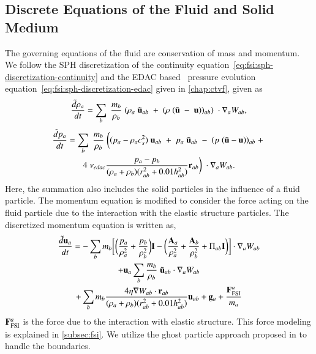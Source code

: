 \subsection{Discrete Equations of the Fluid and Solid Medium}\label{subsec:discrete-fluid}
The governing equations of the fluid are conservation of mass and momentum. We
follow the SPH discretization of the continuity
equation~\eqref{eq:fsi:sph-discretization-continuity} and the EDAC
based~\parencite{PRKP:edac-sph-iccm2015} pressure evolution
equation~\eqref{eq:fsi:sph-discretization-edac} given in \cref{chap:ctvf}, given
as
\begin{equation}
  \label{eq:fsi:sph-discretization-continuity}
  \frac{\tilde{d}\rho_a}{dt} = \sum_{b} \; \frac{m_b}{\rho_{b}} \; (
  \rho_{a} \; \tilde{\mathbf{u}}_{ab} \; + \;
  (\rho \; (\tilde{\mathbf{u}} \; - \;
  \mathbf{u}))_{ab}) \; \cdot \nabla_{a} W_{ab},
\end{equation}
\begin{multline}
  \label{eq:fsi:sph-discretization-edac}
  \frac{\tilde{d}p_a}{dt} = \sum_{b} \; \frac{m_b}{\rho_{b}} \; \bigg(
  (p_{a} - \rho_{a} c_{s}^2) \; \mathbf{u}_{ab} \; + \;
  p_{a} \; \tilde{\mathbf{u}}_{ab} \; - \;
  (p \; (\tilde{\mathbf{u}} - \mathbf{u}))_{ab} \; + \;\\
  4 \; \nu_{edac}
  \frac{p_a - p_b}{(\rho_a + \rho_b) (r^2_{ab} + 0.01 h_{ab}^{2})} \mathbf{r}_{ab}
  \bigg) \; \cdot \nabla_{a} W_{ab}.
\end{multline}
%
Here, the summation also includes the solid particles in the influence of a
fluid particle. The momentum equation is modified to consider the force
acting on the fluid particle due to the interaction with the elastic structure
particles. The discretized momentum equation is written as,
\begin{multline}
  \label{eq:fsi:sph-momentum-fluid}
  \frac{\tilde{d}\mathbf{u}_{a}}{dt} = - \sum_{b} m_b \bigg[
  \bigg(\frac{p_a}{\rho_a^2} + \frac{p_b}{\rho_b^2}\bigg) \mathbf{I} -
  \bigg(\frac{\mathbf{A}_a}{\rho_a^2} + \frac{\mathbf{A}_b}{\rho_b^2} + \Pi_{ab}
  \mathbf{I} \bigg) \bigg]
  \cdot \nabla_{a} W_{ab} \\
  + \mathbf{u}_{a} \sum_{b} \frac{m_b}{\rho_{b}} \; \tilde{\mathbf{u}}_{ab} \cdot
  \nabla_{a} W_{ab} \\+ \sum_{b} m_b \frac{4 \eta \nabla W_{ab}\cdot
    \mathbf{r}_{ab}}{(\rho_a + \rho_b) (r_{ab}^2 + 0.01 h_{ab}^2)} \mathbf{u}_{ab} +
  \mathbf{g}_{a} + \frac{\mathbf{F}^a_{\text{FSI}}}{m_a}
\end{multline}
$\mathbf{F}^a_{\text{FSI}}$ is the force due to the interaction with elastic
structure. This force modeling is explained in \cref{subsec:fsi}. We utilize the
ghost particle approach proposed in \parencite{Adami2012} to handle the boundaries.


